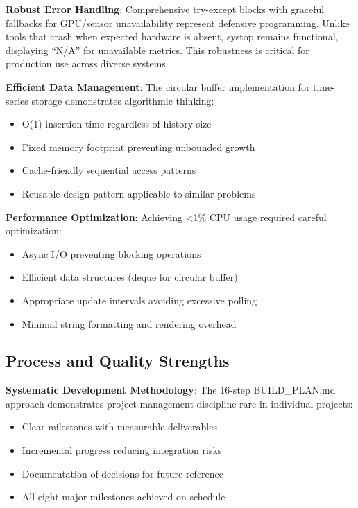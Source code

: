\documentclass[12pt,a4paper,oneside]{report}
\begin{document}
\textbf{Robust Error Handling}: Comprehensive try-except blocks with graceful fallbacks for GPU/sensor unavailability represent defensive programming. Unlike tools that crash when expected hardware is absent, systop remains functional, displaying ``N/A'' for unavailable metrics. This robustness is critical for production use across diverse systems.

\textbf{Efficient Data Management}: The circular buffer implementation for time-series storage demonstrates algorithmic thinking:
\begin{itemize}
    \item O(1) insertion time regardless of history size
    \item Fixed memory footprint preventing unbounded growth
    \item Cache-friendly sequential access patterns
    \item Reusable design pattern applicable to similar problems
\end{itemize}

\textbf{Performance Optimization}: Achieving <1\% CPU usage required careful optimization:
\begin{itemize}
    \item Async I/O preventing blocking operations
    \item Efficient data structures (deque for circular buffer)
    \item Appropriate update intervals avoiding excessive polling
    \item Minimal string formatting and rendering overhead
\end{itemize}

\subsection{Process and Quality Strengths}

\textbf{Systematic Development Methodology}: The 16-step BUILD\_PLAN.md approach demonstrates project management discipline rare in individual projects:
\begin{itemize}
    \item Clear milestones with measurable deliverables
    \item Incremental progress reducing integration risks
    \item Documentation of decisions for future reference
    \item All eight major milestones achieved on schedule
\end{itemize}
\end{document}
